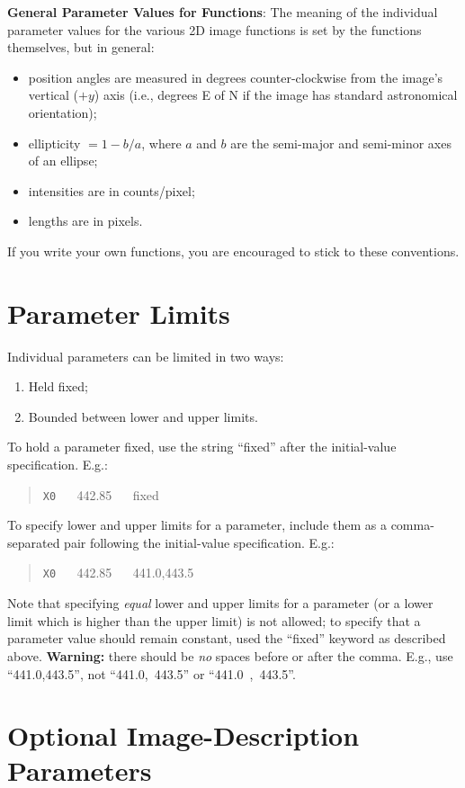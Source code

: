 \documentclass[10pt,a4paper,article]{memoir}
\begin{document}
\bigskip

\textbf{General Parameter Values for Functions}: The meaning of the individual
parameter values for the various 2D image functions is set by the functions
themselves, but in general: 
\begin{itemize}
\item position angles are measured in degrees counter-clockwise
from the image's vertical ($+y$) axis (i.e., degrees E of N if the image has standard
astronomical orientation);
\item ellipticity $= 1 - b/a$, where $a$ and $b$ are the
semi-major and semi-minor axes of an ellipse;
\item intensities are in counts/pixel;
\item lengths are in pixels. 
\end{itemize}
If you write your own functions, you are encouraged
to stick to these conventions.

\section{Parameter Limits}\label{sec:param-limits}

Individual parameters can be limited in two ways:
\begin{enumerate}
\item Held fixed;
\item Bounded between lower and upper limits.
\end{enumerate}
To hold a parameter fixed, use the string ``fixed'' after the initial-value
specification. E.g.:
\begin{quote}
\texttt{X0} ~~ 442.85 ~~ fixed
\end{quote}
To specify lower and upper limits for a parameter, include them as a comma-separated
pair following the initial-value specification. E.g.:
\begin{quote}
\texttt{X0} ~~ 442.85 ~~ 441.0,443.5
\end{quote}
Note that specifying \textit{equal} lower and upper limits for a parameter (or a lower limit
which is higher than the upper limit) is not allowed; to specify that a parameter
value should remain constant, used the ``fixed'' keyword as described above.
\textbf{Warning:} there should be \textit{no} spaces before or after the comma. E.g., use ``441.0,443.5'',
not ``441.0,~443.5'' or ``441.0~,~443.5''.


\section{Optional Image-Description Parameters}
\end{document}
